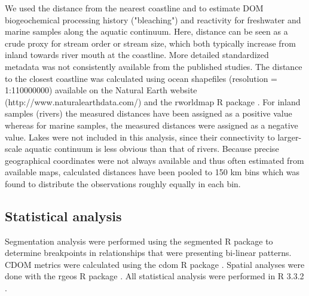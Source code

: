 We used the distance from the nearest coastline and  to estimate DOM biogeochemical processing history ("bleaching") and reactivity for freshwater and marine samples along the aquatic continuum. Here, distance can be seen as a crude proxy for stream order or stream size, which both typically increase from inland towards river mouth at the coastline. More detailed standardized metadata was not consistently available from the published studies. The distance to the closest coastline was calculated using ocean shapefiles (resolution = 1:110000000) available on the Natural Earth website (http://www.naturalearthdata.com/) and the rworldmap R package \citep{South2011}. For inland samples (rivers) the measured distances have been assigned as a positive value whereas for marine samples, the measured distances were assigned as a negative value. Lakes were not included in this analysis, since their connectivity to larger-scale aquatic continuum is less obvious than that of rivers. Because precise geographical coordinates were not always available and thus often estimated from available maps, calculated distances have been pooled to 150 km bins which was found to distribute the observations roughly equally in each bin.

\subsection*{Statistical analysis}

Segmentation analysis were performed using the segmented R package \citep{Muggeo2003, Muggeo2008} to determine breakpoints in relationships that were presenting bi-linear patterns. CDOM metrics were calculated using the cdom R package \citep{Massicotte2016MC}. Spatial analyses were done with the rgeos R package \citep{Bivand2016}. All statistical analysis were performed in R 3.3.2 \citep{RCoreTeam2016}.
